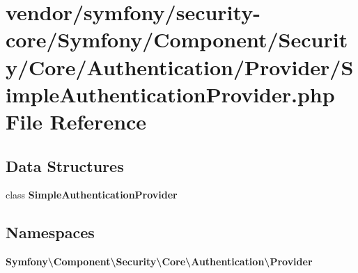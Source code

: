 \section{vendor/symfony/security-\/core/\+Symfony/\+Component/\+Security/\+Core/\+Authentication/\+Provider/\+Simple\+Authentication\+Provider.php File Reference}
\label{_simple_authentication_provider_8php}
\subsection*{Data Structures}
\begin{DoxyCompactItemize}
\item 
class {\bf Simple\+Authentication\+Provider}
\end{DoxyCompactItemize}
\subsection*{Namespaces}
\begin{DoxyCompactItemize}
\item 
 {\bf Symfony\textbackslash{}\+Component\textbackslash{}\+Security\textbackslash{}\+Core\textbackslash{}\+Authentication\textbackslash{}\+Provider}
\end{DoxyCompactItemize}
